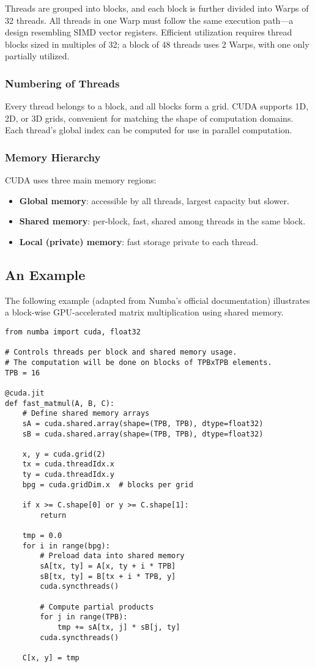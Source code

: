 \documentclass[11pt,a4paper]{book}
\begin{document}
Threads are grouped into blocks, and each block is further divided into Warps of 32 threads. All threads in one Warp must follow the same execution path—a design resembling SIMD vector registers. Efficient utilization requires thread blocks sized in multiples of 32; a block of 48 threads uses 2 Warps, with one only partially utilized.

\subsubsection*{Numbering of Threads}
Every thread belongs to a block, and all blocks form a grid. CUDA supports 1D, 2D, or 3D grids, convenient for matching the shape of computation domains. Each thread’s global index can be computed for use in parallel computation.

\subsubsection*{Memory Hierarchy}
CUDA uses three main memory regions:
\begin{itemize}
  \item \textbf{Global memory}: accessible by all threads, largest capacity but slower.
  \item \textbf{Shared memory}: per-block, fast, shared among threads in the same block.
  \item \textbf{Local (private) memory}: fast storage private to each thread.
\end{itemize}

\subsection*{An Example}
The following example (adapted from Numba’s official documentation) illustrates a block-wise GPU-accelerated matrix multiplication using shared memory.

\begin{lstlisting}
from numba import cuda, float32

# Controls threads per block and shared memory usage.
# The computation will be done on blocks of TPBxTPB elements.
TPB = 16

@cuda.jit
def fast_matmul(A, B, C):
    # Define shared memory arrays
    sA = cuda.shared.array(shape=(TPB, TPB), dtype=float32)
    sB = cuda.shared.array(shape=(TPB, TPB), dtype=float32)

    x, y = cuda.grid(2)
    tx = cuda.threadIdx.x
    ty = cuda.threadIdx.y
    bpg = cuda.gridDim.x  # blocks per grid

    if x >= C.shape[0] or y >= C.shape[1]:
        return

    tmp = 0.0
    for i in range(bpg):
        # Preload data into shared memory
        sA[tx, ty] = A[x, ty + i * TPB]
        sB[tx, ty] = B[tx + i * TPB, y]
        cuda.syncthreads()

        # Compute partial products
        for j in range(TPB):
            tmp += sA[tx, j] * sB[j, ty]
        cuda.syncthreads()

    C[x, y] = tmp
\end{lstlisting}
\end{document}
